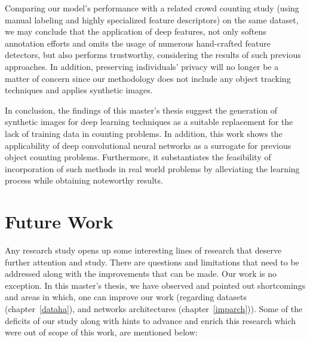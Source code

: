 Comparing our model's performance with a related crowd counting study (using manual labeling and highly specialized feature descriptors) on the same dataset, we may conclude that the application of deep features, not only softens annotation efforts and omits the usage of numerous hand-crafted feature detectors, but also performs trustworthy, considering the results of such previous approaches. In addition, preserving individuals' privacy will no longer be a matter of concern since our methodology does not include any object tracking techniques and applies synthetic images.    

\noindent In conclusion, the findings of this master's thesis suggest the generation of synthetic images for deep learning techniques as a suitable replacement for the lack of training data in counting problems. In addition, this work shows the applicability of deep convolutional neural networks as a surrogate for previous object counting problems. Furthermore, it substantiates the feasibility of incorporation of such methods in real world problems by alleviating the learning process while obtaining noteworthy results.  


\section{Future Work}

Any research study opens up some interesting lines of research that deserve further attention and study. There are questions and limitations that need to be addressed along with the improvements that can be made. Our work is no exception. In this master's thesis, we have observed and pointed out shortcomings and areas in which, one can improve our work (regarding datasets (chapter~\ref{dataha}), and networks architectures (chapter~\ref{imparch})). Some of the deficits of our study along with hints to advance and enrich this research which were out of scope of this work, are mentioned below:

